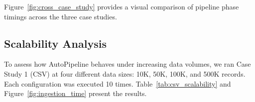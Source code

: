 Figure~\ref{fig:cross_case_study} provides a visual comparison of pipeline phase timings across the three case studies.



\subsection{Scalability Analysis}

To assess how AutoPipeline behaves under increasing data volumes, we ran Case Study 1 (CSV) at four different data sizes: 10K, 50K, 100K, and 500K records. Each configuration was executed 10 times. Table~\ref{tab:csv_scalability} and Figure~\ref{fig:ingestion_time} present the results.

\begin{table}[ht]
\centering
\caption{CSV case study scalability across data sizes (mean $\pm$ std, N=10)}
\label{tab:csv_scalability}
\end{table}


